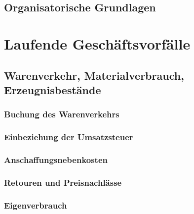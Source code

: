 \documentclass[paper=a4, fontsize=11pt]{scrartcl}
\numberwithin{equation}{section}
\numberwithin{figure}{section}
\numberwithin{table}{section}
\begin{document}

\subsection{Organisatorische Grundlagen}


\newpage

\section{Laufende Geschäftsvorfälle}


\subsection{Warenverkehr, Materialverbrauch, Erzeugnisbestände}


\subsubsection{Buchung des Warenverkehrs}


\subsubsection{Einbeziehung der Umsatzsteuer}


\subsubsection{Anschaffungsnebenkosten}


\subsubsection{Retouren und Preisnachlässe}


\subsubsection{Eigenverbrauch}
\end{document}
